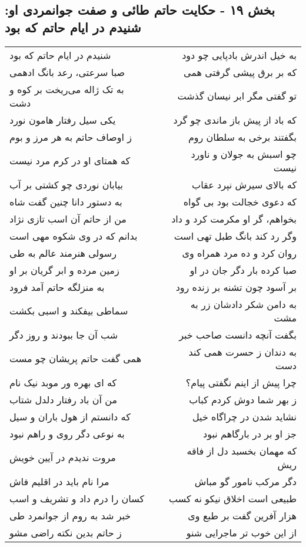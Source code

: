\begin{center}
\section*{بخش ۱۹ - حکایت حاتم طائی و صفت جوانمردی او: شنیدم در ایام حاتم که بود}
\label{sec:019}
\begin{longtable}{l p{0.5cm} r}
شنیدم در ایام حاتم که بود
&&
به خیل اندرش بادپایی چو دود
\\
صبا سرعتی، رعد بانگ ادهمی
&&
که بر برق پیشی گرفتی همی
\\
به تک ژاله می‌ریخت بر کوه و دشت
&&
تو گفتی مگر ابر نیسان گذشت
\\
یکی سیل رفتار هامون نورد
&&
که باد از پیش باز ماندی چو گرد
\\
ز اوصاف حاتم به هر مرز و بوم
&&
بگفتند برخی به سلطان روم
\\
که همتای او در کرم مرد نیست
&&
چو اسبش به جولان و ناورد نیست
\\
بیابان نوردی چو کشتی بر آب
&&
که بالای سیرش نپرد عقاب
\\
به دستور دانا چنین گفت شاه
&&
که دعوی خجالت بود بی گواه
\\
من از حاتم آن اسب تازی نژاد
&&
بخواهم، گر او مکرمت کرد و داد
\\
بدانم که در وی شکوه مهی است
&&
وگر رد کند بانگ طبل تهی است
\\
رسولی هنرمند عالم به طی
&&
روان کرد و ده مرد همراه وی
\\
زمین مرده و ابر گریان بر او
&&
صبا کرده بار دگر جان در او
\\
به منزلگه حاتم آمد فرود
&&
بر آسود چون تشنه بر زنده رود
\\
سماطی بیفکند و اسبی بکشت
&&
به دامن شکر دادشان زر به مشت
\\
شب آن جا ببودند و روز دگر
&&
بگفت آنچه دانست صاحب خبر
\\
همی گفت حاتم پریشان چو مست
&&
به دندان ز حسرت همی کند دست
\\
که ای بهره ور موبد نیک نام
&&
چرا پیش از اینم نگفتی پیام؟
\\
من آن باد رفتار دلدل شتاب
&&
ز بهر شما دوش کردم کباب
\\
که دانستم از هول باران و سیل
&&
نشاید شدن در چراگاه خیل
\\
به نوعی دگر روی و راهم نبود
&&
جز او بر در بارگاهم نبود
\\
مروت ندیدم در آیین خویش
&&
که مهمان بخسبد دل از فاقه ریش
\\
مرا نام باید در اقلیم فاش
&&
دگر مرکب نامور گو مباش
\\
کسان را درم داد و تشریف و اسب
&&
طبیعی است اخلاق نیکو نه کسب
\\
خبر شد به روم از جوانمرد طی
&&
هزار آفرین گفت بر طبع وی
\\
ز حاتم بدین نکته راضی مشو
&&
از این خوب تر ماجرایی شنو
\\
\end{longtable}
\end{center}
